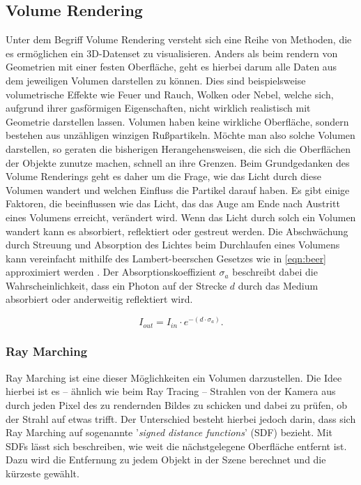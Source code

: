 \newpage
\subsection{Volume Rendering}

Unter dem Begriff Volume Rendering versteht sich eine Reihe von Methoden, die es ermöglichen ein 3D-Datenset zu visualisieren.
Anders als beim rendern von Geometrien mit einer festen Oberfläche, geht es hierbei darum alle Daten aus
dem jeweiligen Volumen darstellen zu können. Dies sind beispielsweise volumetrische Effekte wie Feuer und Rauch, Wolken oder Nebel,
welche sich, aufgrund ihrer gasförmigen Eigenschaften, nicht wirklich realistisch mit Geometrie darstellen lassen.
Volumen haben keine wirkliche Oberfläche, sondern bestehen aus unzähligen winzigen Rußpartikeln.
Möchte man also solche Volumen darstellen, so geraten die bisherigen Herangehensweisen, die sich die Oberflächen der Objekte zunutze machen,
schnell an ihre Grenzen. Beim Grundgedanken des Volume Renderings geht es daher um die Frage, wie das Licht durch diese Volumen
wandert und welchen Einfluss die Partikel darauf haben.
Es gibt einige Faktoren, die beeinflussen wie das Licht, das das Auge am Ende nach Austritt eines Volumens erreicht, verändert wird. Wenn das Licht durch solch ein Volumen wandert
kann es absorbiert, reflektiert oder gestreut werden.
Die Abschwächung durch Streuung und Absorption des Lichtes beim Durchlaufen eines Volumens kann vereinfacht mithilfe des Lambert-beerschen Gesetzes wie in \autoref{eqn:beer}
approximiert werden \parencite{Mayerhofer2020}.
Der Absorptionskoeffizient $\sigma_a$ beschreibt dabei die Wahrscheinlichkeit, dass ein Photon auf der Strecke $d$ durch das Medium absorbiert oder anderweitig
reflektiert wird.

\vspace{-0.5cm  }
\begin{equation}
	\label{eqn:beer}
	I_{out} = I_{in} \cdot e^{- ( d \cdot\sigma_a  )}.
\end{equation}





\subsubsection{Ray Marching}

Ray Marching ist eine dieser Möglichkeiten ein Volumen darzustellen. Die Idee hierbei ist es – ähnlich wie beim Ray Tracing –
Strahlen von der Kamera aus durch jeden Pixel des zu rendernden Bildes zu schicken und dabei zu prüfen, ob der Strahl auf etwas trifft.
Der Unterschied besteht hierbei jedoch darin, dass sich Ray Marching auf sogenannte '\textit{signed distance functions}' (SDF) bezieht.
Mit SDFs lässt sich beschreiben, wie weit die nächstgelegene Oberfläche entfernt ist. Dazu wird die Entfernung zu jedem Objekt
in der Szene berechnet und die kürzeste gewählt.

